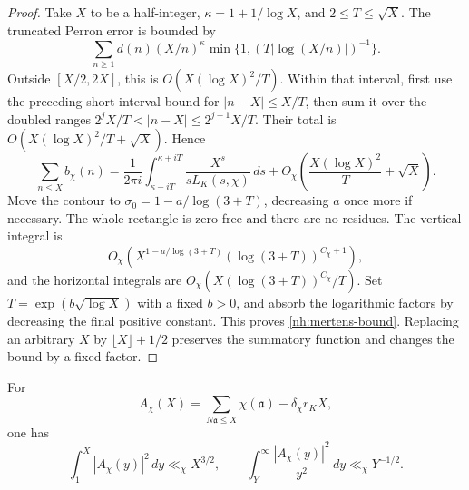 \begin{proof}
Take $X$ to be a half-integer,
$\kappa=1+1/\log X$, and $2\leq T\leq\sqrt X$.
The truncated Perron error is bounded by
\[
 \sum_{n\geq1}d(n)(X/n)^\kappa
       \min\{1,(T|\log(X/n)|)^{-1}\}.
\]
Outside $[X/2,2X]$, this is $O(X(\log X)^2/T)$.
Within that interval, first use the preceding short-interval
bound for $|n-X|\leq X/T$, then sum it over the doubled ranges
$2^jX/T<|n-X|\leq2^{j+1}X/T$.
Their total is $O(X(\log X)^2/T+\sqrt X)$. Hence
\[
 \sum_{n\leq X}b_\chi(n)
 =\frac1{2\pi i}\int_{\kappa-iT}^{\kappa+iT}
          \frac{X^s}{sL_K(s,\chi)}\,ds
 +O_\chi\left(\frac{X(\log X)^2}{T}+\sqrt X\right).
\]
Move the contour to $\sigma_0=1-a/\log(3+T)$, decreasing $a$
once more if necessary. The whole rectangle is zero-free and
there are no residues. The vertical integral is
\[
 O_\chi\left(
 X^{1-a/\log(3+T)}(\log(3+T))^{C_\chi+1}\right),
\]
and the horizontal integrals are
$O_\chi(X(\log(3+T))^{C_\chi}/T)$.
Set $T=\exp(b\sqrt{\log X})$ with a fixed $b>0$, and absorb
the logarithmic factors by decreasing the final positive
constant. This proves \eqref{nh:mertens-bound}.
Replacing an arbitrary $X$ by $\lfloor X\rfloor+1/2$ preserves
the summatory function and changes the bound by a fixed factor.
\end{proof}

\begin{lemma}
\label{nh:mean-square}
For
\[
 A_\chi(X)=\sum_{N\mathfrak a\leq X}\chi(\mathfrak a)
                        -\delta_\chi r_KX,
\]
one has
\begin{equation}\label{nh:mean-square-bound}
 \int_1^X|A_\chi(y)|^2\,dy\ll_\chi X^{3/2},
 \qquad
 \int_Y^\infty\frac{|A_\chi(y)|^2}{y^2}\,dy
                                      \ll_\chi Y^{-1/2}.
\end{equation}
\end{lemma}

